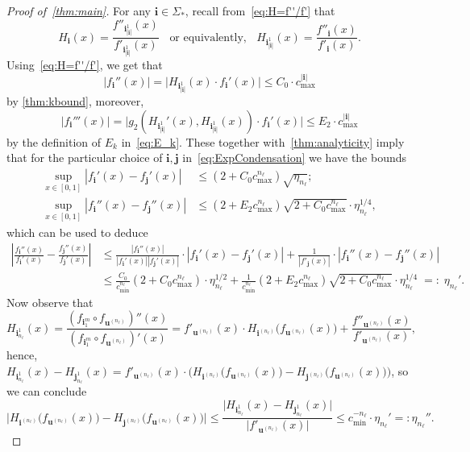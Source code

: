 \documentclass[11pt,]{article}
\def\cref#1{\ref{#1}}%
\theoremstyle{definition}
\theoremstyle{remark}
\newcommand{\0}{\mathbf{0}}
\newcommand{\bi}{\mathbf{i}}
\newcommand{\bj}{\mathbf{j}}
\newcommand{\bu}{\mathbf{u}}
\begin{document}
\begin{proof}[Proof of~\cref{thm:main}]
For any $\bi\in\Sigma_*$, recall from~\cref{eq:H=f''/f'} that
\begin{equation*}
	H_{\bi}(x)= \frac{f''_{\bi_{|\bi|}^1}(x)}{f'_{\bi_{|\bi|}^1}(x)} \;\;\text{ or equivalently,
	}\;\; H_{\bi_{|\bi|}^1}(x) = \frac{f''_{\bi}(x)}{f'_{\bi}(x)}.
\end{equation*}
Using~\eqref{eq:H=f''/f'}, we get that
\begin{equation*}
 |f_{\bi}''(x)| = \big|H_{\bi_{|\bi|}^1}(x)\cdot f_{\bi}'(x)\big|\leq C_0 \cdot c_{\max}^{|\bi|}
\end{equation*}
by \cref{thm:kbound}, moreover,
\begin{equation*}
  |f_{\bi}'''(x)| = \big|g_2(H_{\bi_{|\bi|}^1}'(x),H_{\bi_{|\bi|}^1}(x))\cdot f_{\bi}'(x)\big| \leq
  E_2\cdot c_{\max}^{|\bi|}
\end{equation*}
by the definition of $E_k$ in~\cref{eq:E_k}. These together with~\cref{thm:analyticity} imply that
for the particular choice of $\bi,\bj$ in~\cref{eq:ExpCondensation} we have the bounds
\begin{align*}
 \sup_{x\in[0,1]}|f_{\bi}'(x) - f_{\bj}'(x)| &\leq (2+C_0 c_{\max}^{n_\ell})\sqrt{\eta_{n_\ell}}; \\
 \sup_{x\in[0,1]}|f_{\bi}''(x) - f_{\bj}''(x)| &\leq (2+E_2c_{\max}^{n_\ell})\sqrt{2+C_0
 	c_{\max}^{n_\ell}}\cdot
 \eta_{n_\ell}^{1/4},
\end{align*}
which can be used to deduce
\begin{align*}
	\left|\frac{f_{\bi}''(x)}{f_{\bi}'(x)} - \frac{f_{\bj}''(x)}{f_{\bj}'(x)}\right|
	&\leq
	\frac{|f_{\bi}''(x)|}{|f_{\bi}'(x)||f_{\bj}'(x)|}\cdot|f_{\bi}'(x) - f_{\bj}'(x)|
	+\frac{1}{|f'_{\bj}(x)|} \cdot |f_{\bi}''(x) - f_{\bj}''(x)|
	\\
	&
	\leq \frac{C_0}{c_{\min}^{n_\ell}}(2+C_0c_{\max}^{n_\ell})\cdot \eta_{n_\ell}^{1/2}
	+\frac{1}{c_{\min}^{n_\ell}}(2+E_2
	c_{\max}^{n_\ell})\sqrt{2+C_0 c_{\max}^{n_\ell}} \cdot \eta_{n_\ell}^{1/4} \;=:\;\eta_{n_\ell}'.
\end{align*}
Now observe that
\begin{equation*}
H_{\bi_{n_{\ell}}^1}(x) = \frac{(f_{\bi_1^m}\circ f_{\bu^{(n_{\ell})}})''(x)}{(f_{\bi_1^m}\circ
f_{\bu^{(n_{\ell})}})'(x)} = 
f'_{\bu^{(n_{\ell})}}(x) \cdot H_{\bi^{(n_{\ell})}} \big(f_{\bu^{(n_{\ell})}}(x)\big) + \frac{
f''_{\bu^{(n_{\ell})}}(x) }{ f'_{\bu^{(n_{\ell})}}(x)},
\end{equation*}
hence, $H_{\bi_{n_{\ell}}^1}(x)-H_{\bj_{n_{\ell}}^1}(x) = f'_{\bu^{(n_{\ell})}}(x) \cdot \big(
H_{\bi^{(n_{\ell})}} \big(f_{\bu^{(n_{\ell})}}(x)\big) -H_{\bj^{(n_{\ell})}}
\big(f_{\bu^{(n_{\ell})}}(x)\big) \big)$, so we can conclude
\[
\big| H_{\bi^{(n_{\ell})}} \big(f_{\bu^{(n_{\ell})}}(x)\big) -H_{\bj^{(n_{\ell})}}
\big(f_{\bu^{(n_{\ell})}}(x)\big) \big|
 \leq
 \frac{\big|H_{\bi_{n_{\ell}}^1}(x)-H_{\bj_{n_{\ell}}^1}(x)\big|}{\big|f'_{\bu^{(n_{\ell})}}(x)\big|}
 \leq c_{\min}^{-{n_\ell}}
\cdot \eta_{n_\ell}'
=:\eta_{n_\ell}''.
\]


\end{proof}
\end{document}
